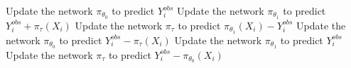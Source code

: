 \begin{algorithm}[t]
  \begin{algorithmic}[1]
  \State Update the network $\pi_{\theta_0}$ to predict $Y_i^{obs}$
  \State Update the network $\pi_{\theta_1}$ to predict $Y_i^{obs} + \pi_\tau(X_i)$
  \State Update the network $\pi_\tau$ to predict $\pi_{\theta_1}(X_i) - Y_i^{obs}$
  \EndIf
  \State Update the network $\pi_{\theta_0}$ to predict $Y_i^{obs} - \pi_\tau(X_i)$
  \State Update the network $\pi_{\theta_1}$ to predict $Y_i^{obs}$
  \State Update the network $\pi_\tau$ to predict $Y_i^{obs} - \pi_{\theta_0}(X_i)$
  \EndIf
  \end{algorithmic}
  \caption{Y-Learner Pseudo Code}
  \label{algo:Ylearner}
  \label{ylearner}
\end{algorithm}
